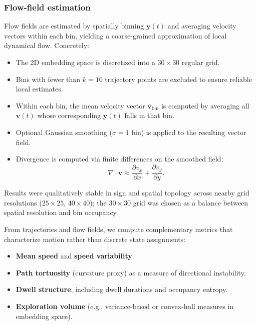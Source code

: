 \documentclass[5p,twocolumn,authoryear]{elsarticle}
\begin{document}
\subsubsection{Flow-field estimation}
\label{sec:flow_field_estimation}
Flow fields are estimated by spatially binning $\mathbf{y}(t)$ and averaging velocity vectors within each bin, yielding a coarse-grained approximation of local dynamical flow. Concretely:
\begin{itemize}
    \item The 2D embedding space is discretized into a $30 \times 30$ regular grid.
    \item Bins with fewer than $k=10$ trajectory points are excluded to ensure reliable local estimates.
    \item Within each bin, the mean velocity vector $\bar{\mathbf{v}}_{\mathrm{bin}}$ is computed by averaging all $\mathbf{v}(t)$ whose corresponding $\mathbf{y}(t)$ falls in that bin.
    \item Optional Gaussian smoothing ($\sigma = 1$ bin) is applied to the resulting vector field.
    \item Divergence is computed via finite differences on the smoothed field:
    \begin{equation}
    \nabla \cdot \mathbf{v} \approx \frac{\partial v_x}{\partial x} + \frac{\partial v_y}{\partial y}.
    \end{equation}
\end{itemize}
Results were qualitatively stable in sign and spatial topology across nearby grid resolutions ($25 \times 25$, $40 \times 40$); the $30 \times 30$ grid was chosen as a balance between spatial resolution and bin occupancy.

From trajectories and flow fields, we compute complementary metrics that characterize motion rather than discrete state assignments:
\begin{itemize}
    \item \textbf{Mean speed} and \textbf{speed variability}.
    \item \textbf{Path tortuosity} (curvature proxy) as a measure of directional instability.
    \item \textbf{Dwell structure}, including dwell durations and occupancy entropy.
    \item \textbf{Exploration volume} (e.g., variance-based or convex-hull measures in embedding space).
\end{itemize}
\end{document}
